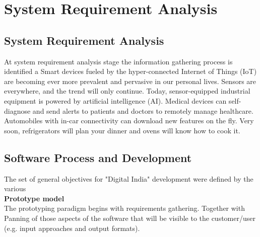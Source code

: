 \chapter{System Requirement Analysis}


\section{System Requirement Analysis}
At system requirement analysis stage the information gathering process is identified a Smart devices fueled by the hyper-connected Internet of Things (IoT) are becoming
ever more prevalent and pervasive in our personal lives. Sensors are everywhere, and the trend will only continue. Today, sensor-equipped industrial equipment is powered by artificial intelligence (AI). Medical devices can self-diagnose and send alerts to patients and doctors to remotely manage healthcare. Automobiles with in-car connectivity can download new features on the fly. Very soon, refrigerators will plan your dinner and ovens will know how to cook it.






\section{Software Process and Development}
The set of general objectives for "Digital India" development were defined by the various \\
\textbf{Prototype model}\\

The prototyping paradigm begins with requirements gathering. Together with Panning of those aspects of the software that will be visible to the customer/user (e.g. input approaches and output formats).

